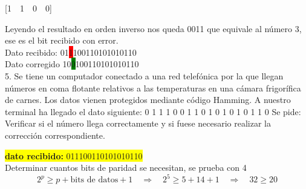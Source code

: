 \documentclass{article}
\begin{document}
	\begin{center}
		\vspace{0.5cm}
		[1~~1~~0~~0]\\
	\end{center}	
	\vspace{0.5cm}
	Leyendo el resultado en orden inverso nos queda 0011 que equivale al número 3, ese es el bit recibido con error.\\
	Dato recibido: 01\colorbox{red}{1}100110101010110\\
	Dato corregido 10\colorbox{green}{0}100110101010110\\
		

	5. Se tiene un computador conectado a una red telefónica por la que llegan números en
	coma flotante relativos a las temperaturas en una cámara frigorífica de carnes. Los
	datos vienen protegidos mediante código Hamming. A nuestro terminal ha llegado
	el dato siguiente: 0 1 1 1 0 0 1 1 0 1 0 1 0 1 0 1 1 0
	Se pide: Verificar si el número llega correctamente y si fuese necesario realizar la
	corrección correspondiente.

	\begin{center}
		\hspace{3cm}\colorbox{yellow}{{\textbf{dato recibido:} 011100110101010110}}\newline
		\\Determinar cuantos bits de paridad se necesitan, se prueba con 4
		\[
		2^p \geq p + \text{bits de datos} + 1
		\quad \Rightarrow \quad	2^5 \geq 5 + 14 + 1 \quad \Rightarrow \quad 32 \geq 20
		\]
	\end{center}
	
\end{document}
